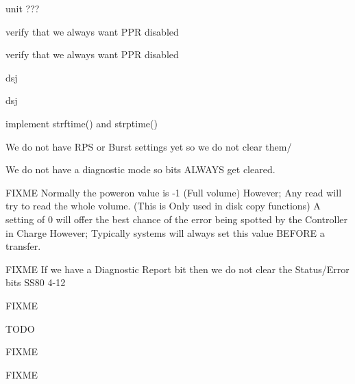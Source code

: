 \begin{DoxyRefList}
unit ???  
\item[\label{todo__todo000002}%
\hypertarget{todo__todo000002}{}%
Global \hyperlink{amigo_8h_ab63435382919a7106a374b021861a2e1}{amigo\+\_\+init} (void)]verify that we always want P\+PR disabled  
\item[\label{todo__todo000002}%
\hypertarget{todo__todo000002}{}%
Global \hyperlink{amigo_8h_ab63435382919a7106a374b021861a2e1}{amigo\+\_\+init} (void)]verify that we always want P\+PR disabled  
\item[\label{todo__todo000003}%
\hypertarget{todo__todo000003}{}%
Global \hyperlink{amigo_8h_afb2f0c0517c5c10c38f8e15b8b281a8c}{amigo\+\_\+request\+\_\+status} (void)]dsj  
\item[\label{todo__todo000003}%
\hypertarget{todo__todo000003}{}%
Global \hyperlink{amigo_8h_afb2f0c0517c5c10c38f8e15b8b281a8c}{amigo\+\_\+request\+\_\+status} (void)]dsj  
\item[\label{todo__todo000001}%
\hypertarget{todo__todo000001}{}%
Global \hyperlink{time_8h_a7ffc52def0c7fbf70c50248e3f7d6a8a}{asctime\+\_\+r} (tm\+\_\+t $\ast$t, char $\ast$buf)]implement strftime() and strptime()  
\item[\label{todo__todo000056}%
\hypertarget{todo__todo000056}{}%
Global \hyperlink{ss80_8h_aa48ccb1479e226dacfaa1dac15631a9d}{Clear\+\_\+\+Common} (int u)]We do not have R\+PS or Burst settings yet so we do not clear them/ 

We do not have a diagnostic mode so bits A\+L\+W\+A\+YS get cleared. 

F\+I\+X\+ME Normally the poweron value is -\/1 (Full volume) However; Any read will try to read the whole volume. (This is Only used in disk copy functions) A setting of 0 will offer the best chance of the error being spotted by the Controller in Charge However; Typically systems will always set this value B\+E\+F\+O\+RE a transfer. 

F\+I\+X\+ME If we have a Diagnostic Report bit then we do not clear the Status/\+Error bits S\+S80 4-\/12  
\item[\label{todo__todo000063}%
\hypertarget{todo__todo000063}{}%
Global \hyperlink{fatfs__utils_8h_a97a2409a53057e1a63537f196ff00a50}{fatfs\+\_\+cat} (char $\ast$name)]F\+I\+X\+ME  
\item[\label{todo__todo000015}%
\hypertarget{todo__todo000015}{}%
Global \hyperlink{gpib__task_8h_ac63d4e431ab55dddfbf436d87135128e}{G\+P\+IB} (uint8\+\_\+t ch)]T\+O\+DO 

F\+I\+X\+ME 

F\+I\+X\+ME 


\end{DoxyRefList}
